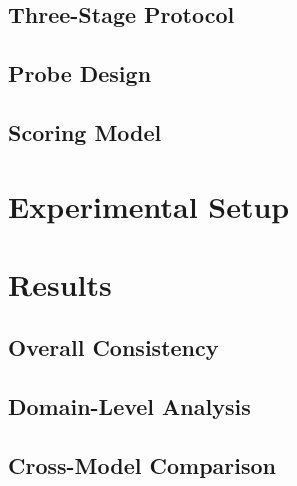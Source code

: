 \documentclass[11pt]{article}
\begin{document}
\subsection{Three-Stage Protocol}

\subsection{Probe Design}

\subsection{Scoring Model}

\section{Experimental Setup}
\label{sec:setup}


\section{Results}
\label{sec:results}

\subsection{Overall Consistency}

\subsection{Domain-Level Analysis}

\subsection{Cross-Model Comparison}
\end{document}
